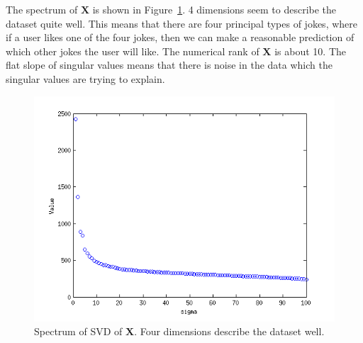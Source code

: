 \documentclass{article}
\begin{document}
\begin{homeworkProblem}

    The spectrum of $\bm{X}$ is shown in Figure~\ref{fig:prob4}. 4 dimensions
    seem to describe the dataset quite well. This means that there are four
    principal types of jokes, where if a user likes one of the four jokes, then
    we can make a reasonable prediction of which other jokes the user will like.
    The numerical rank of $\bm{X}$ is about 10. The flat slope of singular
    values means that there is noise in the data which the singular values are
    trying to explain.

    \begin{figure}[!ht]
        
        \includegraphics[width=\linewidth]{prob4_fig.png}

        \caption{\label{fig:prob4} Spectrum of SVD of $\bm{X}$. Four dimensions
        describe the dataset well.}

    \end{figure}

\end{homeworkProblem}
\clearpage
\end{document}
